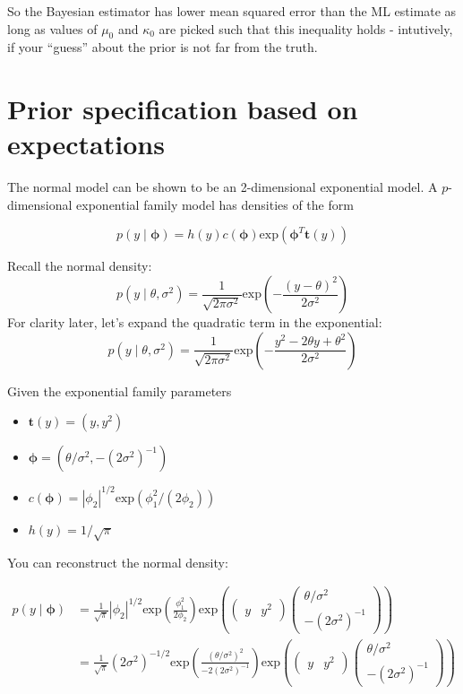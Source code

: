 \documentclass[]{article}
\providecommand{\tightlist}{%
  \setlength{\itemsep}{0pt}\setlength{\parskip}{0pt}}
\begin{document}
So the Bayesian estimator has lower mean squared error than the ML
estimate as long as values of \(\mu_0\) and \(\kappa_0\) are picked such
that this inequality holds - intutively, if your ``guess'' about the
prior is not far from the truth.

\hypertarget{prior-specification-based-on-expectations}{%
\section{Prior specification based on
expectations}\label{prior-specification-based-on-expectations}}

The normal model can be shown to be an 2-dimensional exponential model.
A \(p\)-dimensional exponential family model has densities of the form

\[p(y \mid \boldsymbol{\phi}) = h(y) c(\boldsymbol{\phi}) \text{exp}\left( \boldsymbol{\phi}^T \mathbf{t}(y) \right)\]

Recall the normal density:
\[p(y \mid \theta, \sigma^2) = \frac{1}{\sqrt{2 \pi \sigma^2}} \text{exp} \left( - \frac{(y - \theta)^2}{2\sigma^2} \right)\]
For clarity later, let's expand the quadratic term in the exponential:
\[p(y \mid \theta, \sigma^2) = \frac{1}{\sqrt{2 \pi \sigma^2}} \text{exp} \left( - \frac{y^2 - 2\theta y + \theta^2}{2\sigma^2} \right)\]

Given the exponential family parameters

\begin{itemize}
\tightlist
\item
  \(\mathbf{t}(y) = (y, y^2)\)
\item
  \(\boldsymbol{\phi} = (\theta / \sigma^2, -(2\sigma^2)^{-1})\)
\item
  \(c(\boldsymbol{\phi}) = | \phi_2 |^{1 / 2} \text{exp}\left(\phi_1^2 / (2\phi_2) \right)\)
\item
  \(h(y) = 1 / \sqrt{\pi}\)
\end{itemize}

You can reconstruct the normal density:

\begin{align}
p(y \mid \boldsymbol{\phi}) &= \frac{1}{\sqrt{\pi}} | \phi_2 |^{1/2} \text{exp}\left( \frac{\phi_1^2}{2\phi_2} \right) \text{exp} \left(\begin{pmatrix} y & y^2 \end{pmatrix}  \begin{pmatrix} \theta/\sigma^2 \\ -(2\sigma^2)^{-1} \end{pmatrix}  \right) \\
&= \frac{1}{\sqrt{\pi}} (2\sigma^2)^{-1/2} \text{exp}\left( \frac{(\theta / \sigma^2)^2}{-2(2\sigma^2)^{-1}} \right) \text{exp} \left(\begin{pmatrix} y & y^2 \end{pmatrix}  \begin{pmatrix} \theta/\sigma^2 \\ -(2\sigma^2)^{-1} \end{pmatrix} \right) \\
\end{align}
\end{document}

